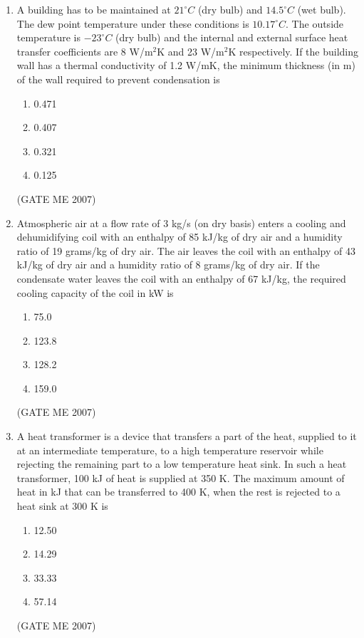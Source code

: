 \documentclass[journal]{IEEEtran}
\begin{document}
\begin{enumerate}
\item A building has to be maintained at $ 21^\circ C $ (dry bulb) and $ 14.5^\circ C $ (wet bulb). The dew point temperature under these conditions is $ 10.17^\circ C $. The outside temperature is $ -23^\circ C $ (dry bulb) and the internal and external surface heat transfer coefficients are 8 W/m$^2$K and 23 W/m$^2$K respectively. If the building wall has a thermal conductivity of 1.2 W/mK, the minimum thickness (in m) of the wall required to prevent condensation is
\begin{multicols}{4}
\begin{enumerate}
\item 0.471
\item 0.407
\item 0.321
\item 0.125
\end{enumerate}
\end{multicols}
\hfill (GATE ME 2007)

\item Atmospheric air at a flow rate of 3 kg/s (on dry basis) enters a cooling and dehumidifying coil with an enthalpy of 85 kJ/kg of dry air and a humidity ratio of 19 grams/kg of dry air. The air leaves the coil with an enthalpy of 43 kJ/kg of dry air and a humidity ratio of 8 grams/kg of dry air. If the condensate water leaves the coil with an enthalpy of 67 kJ/kg, the required cooling capacity of the coil in kW is
\begin{multicols}{4}
\begin{enumerate}
\item 75.0
\item 123.8
\item 128.2
\item 159.0
\end{enumerate}
\end{multicols}
\hfill (GATE ME 2007)

\item A heat transformer is a device that transfers a part of the heat, supplied to it at an intermediate temperature, to a high temperature reservoir while rejecting the remaining part to a low temperature heat sink. In such a heat transformer, 100 kJ of heat is supplied at 350 K. The maximum amount of heat in kJ that can be transferred to 400 K, when the rest is rejected to a heat sink at 300 K is
\begin{multicols}{4}
\begin{enumerate}
\item 12.50
\item 14.29
\item 33.33
\item 57.14
\end{enumerate}
\end{multicols}
\hfill (GATE ME 2007)


\end{enumerate}
\end{document}
